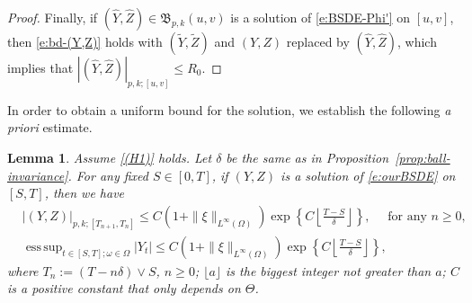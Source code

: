 \documentclass[11pt,reqno]{amsart}
\newtheorem{lemma}{Lemma}[section]
\DeclareMathOperator*{\esssup}{ess\,sup}
\numberwithin{equation}{section}
\begin{document}
\begin{proof}
Finally, if $(\widehat{Y},\widehat{Z})\in \mathfrak{B}_{p,k}(u,v)$ is a solution of \eqref{e:BSDE-Phi'} on $[u,v]$, then \eqref{e:bd-(Y,Z)} holds with $(\tilde{Y}, \tilde Z)$ and $(Y, Z)$ replaced by $(\widehat{Y}, \widehat Z)$, which implies that $|(\widehat{Y},\widehat{Z})|_{p,k;[u,v]}\le R_{0}$.
\end{proof}


In order to obtain a uniform bound for the solution, we establish the following \emph{a priori} estimate.
\begin{lemma}\label{lem:prior estimate}
Assume \ref{(H1)} holds. Let $\delta$ be the same as in Proposition~\ref{prop:ball-invariance}. For any fixed $S\in[0,T]$, if $(Y,Z)$ is a solution of \eqref{e:ourBSDE} on $[S,T]$, then we have
\begin{align}\label{e:bound1}
&\left|(Y,Z)\right|_{p,k;[T_{n+1},T_{n}]}\le C\left(1+\|\xi\|_{L^{\infty}(\Omega)}\right)\exp\left\{C\left\lfloor \frac{T-S}{\delta}\right\rfloor\right\},\quad \text{ for any } n\ge 0,\\ \label{e:bound2}
&\esssup_{t\in[S,T];\omega\in\Omega}|Y_{t}|\le C\left(1+\|\xi\|_{L^{\infty}(\Omega)}\right)\exp\left\{C\left\lfloor \frac{T-S}{\delta}\right\rfloor\right\},
\end{align} 
where $T_{n} := (T-n\delta)\vee S$, $n\ge 0$; $\lfloor a\rfloor$ is the biggest integer not greater than $a$; $C$ is a positive constant that  only depends on $\Theta$. 
\end{lemma}
\end{document}
